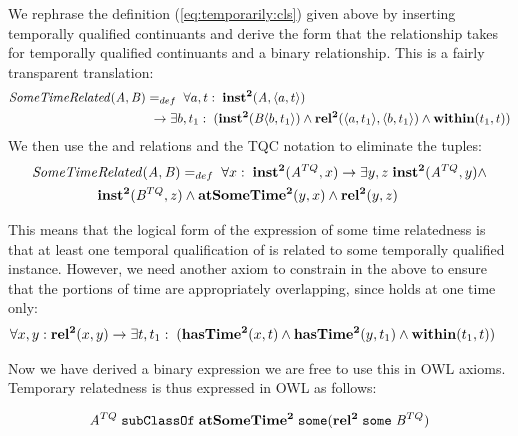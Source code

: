 We rephrase the definition (\ref{eq:temporarily:cls}) given above by inserting
temporally qualified continuants and derive the form that the relationship takes
for temporally qualified continuants and a binary relationship. This is a fairly
transparent translation:
%
\begin{equation}
\begin{split}
\mathit{SomeTimeRelated}(\mathit{A},\mathit{B})& =_{def}\;
\forall a, t:\; \mathrm{\mathbf{inst^2}}(\mathit{A}, \langle a,t\rangle) \\
&\ \rightarrow
\exists b, t_1:\;(\mathrm{\mathbf{inst^2}}(\mathit{B}\langle b,t_1\rangle) \wedge
\mathrm{\mathbf{rel^2}}(\langle a,t_1\rangle,\langle b,t_1\rangle) \wedge \mathrm{\mathbf{within}}(t_1,t))
\end{split}
\end{equation}
%
We then use the  and  relations and the TQC notation to eliminate
the tuples:
\begin{equation}
\begin{split}
\mathit{SomeTime}&\mathit{Related}(\mathit{A},\mathit{B}) =_{def}\;
\forall x:\; \mathrm{\mathbf{inst^2}}(\mathit{A}^{TQ}, x)
 \rightarrow
\exists y,z \; \mathrm{\mathbf{inst^2}}(\mathit{A}^{TQ},y) \wedge \\ & \mathrm{\mathbf{inst^2}}(\mathit{B}^{TQ},z)
 \wedge \mathrm{\mathbf{atSomeTime^2}}(y,x) \wedge \mathrm{\mathbf{rel^2}}(y,z)
\end{split}
\label{eq:usesSame}
\end{equation}

This means that the logical form of the expression of some time relatedness is that
at least one temporal qualification of  is related to some temporally
qualified  instance.
However, we need another axiom to constrain  in the above to ensure that the
portions of time are appropriately overlapping, since  holds at one time
only:
\begin{equation}
\begin{split}
\forall x,y:\;& \mathrm{\mathbf{rel^2}}(x,y) \rightarrow \exists t,t_1:\;
(\mathrm{\mathbf{hasTime^2}}(x, t) \wedge \mathrm{\mathbf{hasTime^2}}(y,t_1) \wedge \mathrm{\mathbf{within}}(t_1,t))
\end{split}
\end{equation}

Now we have derived a binary expression  we are free to use this in OWL
axioms. Temporary relatedness is thus expressed in OWL as follows:

\begin{equation}
\mathit{A}^{TQ}\;\mathtt{subClassOf}\;\mathrm{\mathbf{atSomeTime^2}}\;\mathtt{some
(}\mathrm{\mathbf{rel^2}}\;\mathtt{some}\;\mathit{B}^{TQ})
\label{eq:tqc:temp}
\end{equation}

